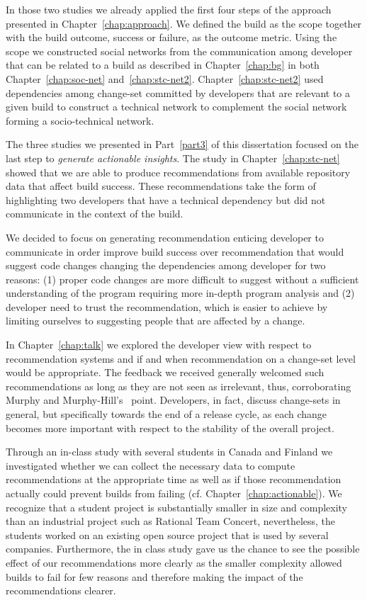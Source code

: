 In those two studies we already applied the first four steps of the approach presented in Chapter~\ref{chap:approach}.
We defined the build as the scope together with the build outcome, success or failure, as the outcome metric.
Using the scope we constructed social networks from the communication among developer that can be related to a build as described in Chapter~\ref{chap:bg} in both Chapter~\ref{chap:soc-net} and~\ref{chap:stc-net2}.
Chapter~\ref{chap:stc-net2} used dependencies among change-set committed by developers that are relevant to a given build to construct a technical network to complement the social network forming a socio-technical network.

The three studies we presented in Part~\ref{part3} of this dissertation focused on the last step to \emph{generate actionable insights}.
The study in Chapter~\ref{chap:stc-net} showed that we are able to produce recommendations from available repository data that affect build success.
These recommendations take the form of highlighting two developers that have a technical dependency but did not communicate in the context of the build.

We decided to focus on generating recommendation enticing developer to communicate in order improve build success over recommendation that would suggest code changes changing the dependencies among developer for two reasons:
(1) proper code changes are more difficult to suggest without a sufficient understanding of the program requiring more in-depth program analysis and 
(2) developer need to trust the recommendation, which is easier to achieve by limiting ourselves to suggesting people that are affected by a change.

In Chapter~\ref{chap:talk} we explored the developer view with respect to recommendation systems and if and when recommendation on a change-set level would be appropriate.
The feedback we received generally welcomed such recommendations as long as they are not seen as irrelevant, thus, corroborating Murphy and Murphy-Hill's~\cite{murphy:rsse:2010} point.
Developers, in fact, discuss change-sets in general, but specifically towards the end of a release cycle, as each change becomes more important with respect to the stability of the overall project.

Through an in-class study with several students in Canada and Finland we investigated whether we can collect the necessary data to compute recommendations at the appropriate time as well as if those recommendation actually could prevent builds from failing (cf. Chapter~\ref{chap:actionable}).
We recognize that a student project is substantially smaller in size and complexity than an industrial project such as Rational Team Concert, nevertheless, the students worked on an existing open source project that is used by several companies.
Furthermore, the in class study gave us the chance to see the possible effect of our recommendations more clearly as the smaller complexity allowed builds to fail for few reasons and therefore making the impact of the recommendations clearer.


